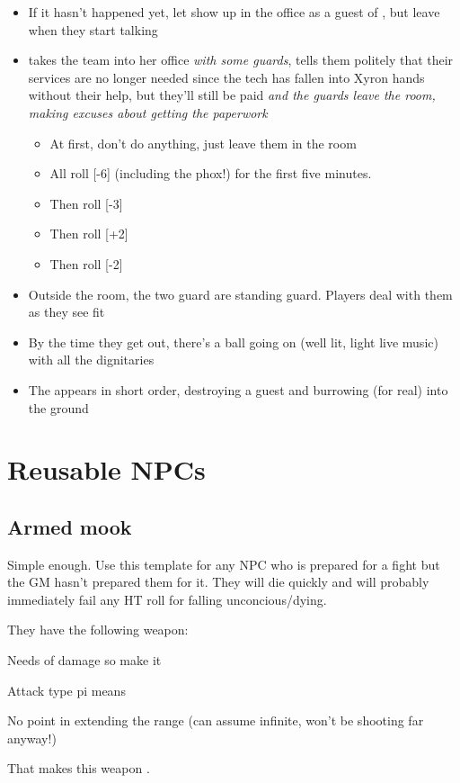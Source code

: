 \begin{itemize}
\item If it hasn't happened yet, let  show up in the office as
  a guest of , but leave when they start talking
\item {} takes the team into her office \emph{with some guards}, tells
  them politely that their services are no longer needed since the tech has
  fallen into Xyron hands without their help, but they'll still be paid
  \emph{ and the guards leave the room, making excuses about getting
    the paperwork}
  \begin{itemize}
  \item At first, don't do anything, just leave them in the room
  \item All roll [-6] (including the phox!) for the first five minutes. 
  \item Then roll [-3]
  \item Then roll [+2]
  \item Then roll [-2]
  \end{itemize}
  
\item Outside the room, the two guard are standing guard. Players deal with them
  as they see fit

  
\item By the time they get out, there's a ball going on (well lit, light live
  music) with all the dignitaries 
\item The  appears in short order, destroying a guest and
  burrowing (for real) into the ground
\end{itemize}

\chapter{Reusable NPCs}
\label{cha:reusable-npcs}

\section{Armed mook}
\label{sec:armed-mook}

Simple enough. Use this template for any NPC who is prepared for a fight but
the GM hasn't prepared them for it. They will die quickly and will probably
immediately fail any HT roll for falling unconcious/dying.

They have the following weapon:
\begin{innateattack}
  \item Needs  of damage so make it 
  \item Attack type pi means 
  \item No point in extending the range (can assume infinite, won't be shooting
    far anyway!)
  \item That makes this weapon \InnateAttackTotalPoints.
\end{innateattack}

